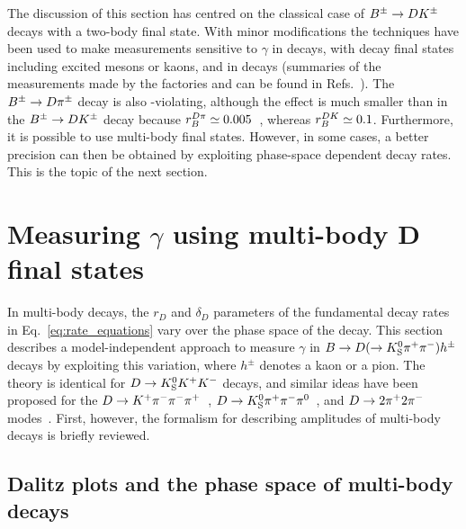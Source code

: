 The discussion of this section has centred on the classical case of ${{B}^\pm}\rightarrow D{{K}^\pm}$ decays with a two-body \D final state. With minor modifications the techniques have been used to make measurements sensitive to $\gamma$ in \Bz decays, with \B decay final states including excited \D mesons or kaons, and in \BtoDpi decays (summaries of the measurements made by the \B factories and \lhcb can be found in Refs.~\cite{BelleCombo,BabarCombo,LHCb-PAPER-2016-032,LHCb-CONF-2018-002}). The ${{B}^\pm}\rightarrow D {{\pi}^\pm}$ decay is also \CP-violating, although the effect is much smaller than in the ${{B}^\pm}\rightarrow D{{K}^\pm}$ decay because $r_B^{{D}\pi}\simeq 0.005$~\cite{rDpi}, whereas $r_B^{{D} K}\simeq 0.1$. Furthermore, it is possible to use multi-body \D final states. However, in some cases, a better precision can then be obtained by exploiting phase-space dependent decay rates. This is the topic of the next section.



\section{\texorpdfstring{Measuring $\gamma$ using multi-body D final states}{Measuring gamma using multi-body D final states}} %
\label{sec:gamma_with_multibody_d_final_states}


In multi-body \D decays, the $r_D$ and $\delta_D$ parameters of the fundamental decay rates in Eq.~\eqref{eq:rate_equations} vary over the phase space of the \D decay. This section describes a model-independent approach to measure $\gamma$ in ${B}\rightarrow{\ensuremath{D}}(\rightarrow{\ensuremath{{K}^0_{\mathrm{S}}}}{\ensuremath{{\pi}^+}}{\ensuremath{{\pi}^-}})h^\pm$ decays by exploiting this variation, where $h^\pm$ denotes a kaon or a pion. The theory is identical for ${D}\rightarrow{\ensuremath{{K}^0_{\mathrm{S}}}}{\ensuremath{{K}^+}}{\ensuremath{{K}^-}}$ decays, and similar ideas have been proposed for the ${D}\rightarrow{\ensuremath{{K}^+}}{\ensuremath{{\pi}^-}}{\ensuremath{{\pi}^-}}{\ensuremath{{\pi}^+}}$~\cite{evansImprovedSensitivityCKM2020}, ${D}\rightarrow{\ensuremath{{K}^0_{\mathrm{S}}}}{\ensuremath{{\pi}^+}}{\ensuremath{{\pi}^-}}{\ensuremath{{\pi}^0}}$~\cite{K:2017qxf}, and ${D}\rightarrow2{{\pi}^+}2{{\pi}^-}$ modes~\cite{harnewModelindependentDeterminationStrong2018}. First, however, the formalism for describing amplitudes of multi-body decays is briefly reviewed.


\subsection{Dalitz plots and the phase space of multi-body decays} %
\label{sub:the_phase_space_of_multibody_decays_and_dalitz_plots}

